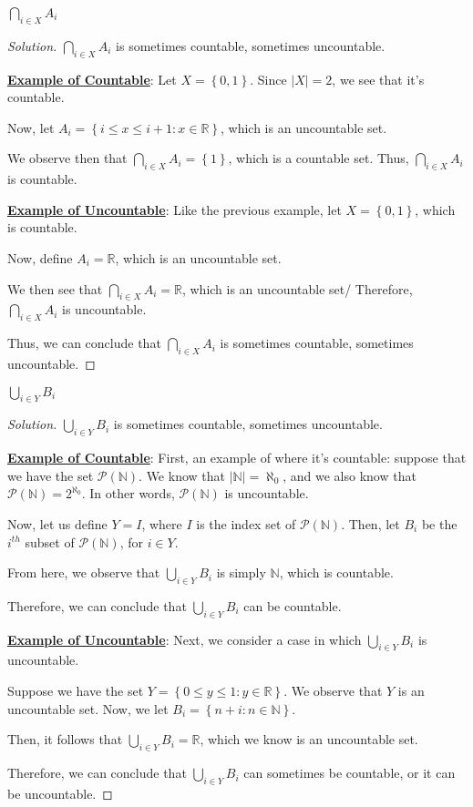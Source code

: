 \documentclass{article}
\newenvironment{solution}{\begin{proof}[Solution]}{\end{proof}}
\newcommand{\NN}{\mathbb{N}}
\newcommand{\RR}{\mathbb{R}}
\begin{document}
\begin{hw}
	$\bigcap_{i \in X} A_i$
\end{hw}
\begin{solution}
	$\bigcap_{i \in X} A_i$ is sometimes countable, sometimes uncountable.
	
	\textbf{\underline{Example of Countable}}: Let $X = \left\{  0, 1\right\}$. Since $\lvert X \rvert = 2$, we see that it's countable.
	
	Now, let $A_{i} = \left\{ i \leq x \leq i + 1 : x \in \RR \right\}$, which is an uncountable set.
	
	We observe then that $\bigcap_{i \in X} A_i = \left\{  1 \right\}$, which is a countable set. Thus, $\bigcap_{i \in X} A_i$ is countable.
	
	\textbf{\underline{Example of Uncountable}}: Like the previous example, let $X = \left\{  0, 1\right\}$, which is countable.
	
	Now, define $A_{i} = \RR$, which is an uncountable set.
	
	We then see that $\bigcap_{i \in X} A_i = \RR$, which is an uncountable set/ Therefore, $\bigcap_{i \in X} A_i$ is uncountable.
	
	Thus, we can conclude that $\bigcap_{i \in X} A_i$ is sometimes countable, sometimes uncountable.
\end{solution}

\begin{hw}
	$\bigcup_{i \in Y} B_i$
\end{hw}
\begin{solution}
	$\bigcup_{i \in Y} B_{i}$ is sometimes countable, sometimes uncountable.
	
	\textbf{\underline{Example of Countable}}: First, an example of where it's countable: suppose that we have the set $\mathscr{P}(\mathbb{N})$. We know that $\lvert \NN \rvert = \aleph_0$, and we also know that $\mathscr{P}(\NN) = 2^{\aleph_{0}}$. In other words, $\mathscr{P}(\mathbb{N})$ is uncountable.
	
	Now, let us define $Y = I$, where $I$ is the index set of $\mathscr{P}(\NN)$. Then, let $B_{i}$ be the $i^{th}$ subset of $\mathscr{P}(\NN)$, for $i \in Y$.
	
	From here, we observe that $\bigcup_{i \in Y} B_{i}$ is simply $\mathbb{N}$, which is countable.
	
	Therefore, we can conclude that $\bigcup_{i \in Y} B_{i}$ can be countable.
	
	\textbf{\underline{Example of Uncountable}}: Next, we consider a case in which $\bigcup_{i \in Y} B_{i}$ is uncountable.
	
	Suppose we have the set $Y = \left\{0 \leq y \leq 1 : y \in \RR \right\}$. We observe that $Y$ is an uncountable set. Now, we let $B_{i} = \left\{ n + i : n \in \NN \right\}$.
	
	Then, it follows that $\bigcup_{i \in Y} B_{i} = \RR$, which we know is an uncountable set.
	
	Therefore, we can conclude that $\bigcup_{i \in Y} B_{i}$ can sometimes be countable, or it can be uncountable.
\end{solution}
\end{document}
